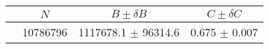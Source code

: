 \begin{tabular}{lccc}
\hline
    &   $N$   & $B \pm \delta B$  &  $C \pm \delta C$ \\
\hline
                               & 10786796   & 1117678.1  $\pm$ 96314.6 & 0.675      $\pm$ 0.007 \\
\hline
\end{tabular}

